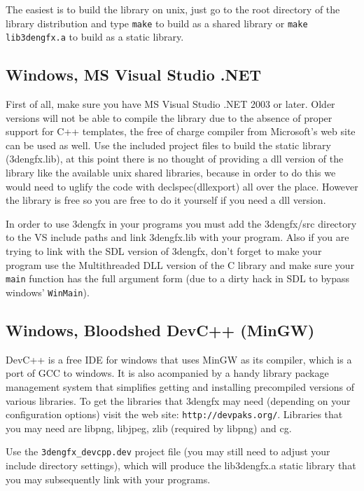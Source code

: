 The easiest is to build the library on unix, just go to the root directory of
the library distribution and type \verb|make| to build as a shared library or
\verb|make lib3dengfx.a| to build as a static library.

\subsection{Windows, MS Visual Studio .NET}
First of all, make sure you have MS Visual Studio .NET 2003 or later. Older
versions will not be able to compile the library due to the absence of proper
support for C++ templates, the free of charge compiler from Microsoft's web site
can be used as well. Use the included project files to build the static library
(3dengfx.lib), at this point there is no thought of providing a dll version of
the library like the available unix shared libraries, because in order to do
this we would need to uglify the code with declspec(dllexport) all over the
place. However the library is free so you are free to do it yourself if you need
a dll version.

In order to use 3dengfx in your programs you must add the 3dengfx/src directory
to the VS include paths and link 3dengfx.lib with your program. Also if you are
trying to link with the SDL version of 3dengfx, don't forget to make your
program use the Multithreaded DLL version of the C library and make sure your
\verb|main| function has the full argument form (due to a dirty hack in SDL to
bypass windows' \verb|WinMain|).

\subsection{Windows, Bloodshed DevC++ (MinGW)}
DevC++ is a free IDE for windows that uses MinGW as its compiler, which is a
port of GCC to windows. It is also acompanied by a handy library package management
system that simplifies getting and installing precompiled versions of various
libraries. To get the libraries that 3dengfx may need (depending on your
configuration options) visit the web site: \verb|http://devpaks.org/|. Libraries
that you may need are libpng, libjpeg, zlib (required by libpng) and cg.

Use the \verb|3dengfx_devcpp.dev| project file (you may still need to adjust
your include directory settings), which will produce the lib3dengfx.a static
library that you may subsequently link with your programs.

